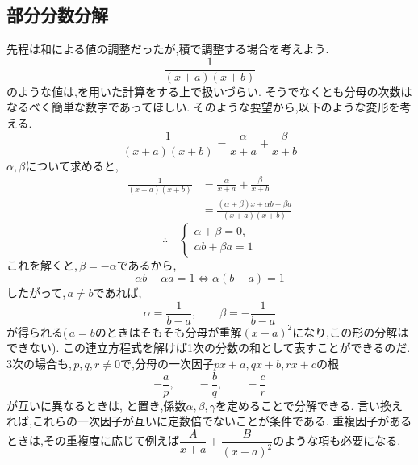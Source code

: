   \subsection{部分分数分解}\label{節：部分分数分解}
    先程は和による値の調整だったが,積で調整する場合を考えよう.
    \[
      \frac{1}{(x+a)(x+b)}
    \]
    のような値は,を用いた計算をする上で扱いづらい.
    そうでなくとも分母の次数はなるべく簡単な数字であってほしい.
    そのような要望から,以下のような変形を考える.
    \[
      \frac{1}{(x+a)(x+b)}=\frac{\alpha}{x+a}+\frac{\beta}{x+b}
    \]
    $\alpha,\beta$について求めると,
    \begin{align*}
    \frac{1}{(x+a)(x+b)}
      &= \frac{\alpha}{x+a}+\frac{\beta}{x+b}\\
      &= \frac{(\alpha+\beta)x+\alpha b+\beta a}
      {(x+a)(x+b)}
    \end{align*}
    \[
    \therefore\quad
    \begin{cases}
    \alpha+\beta=0,\\
    \alpha b+\beta a=1
    \end{cases}
    \]
    これを解くと,\,$\beta=-\alpha$であるから,
    \[
      \alpha b-\alpha a=1
      \iff \alpha(b-a)=1
    \]
    したがって,\,$a\ne b$であれば,
    \[
      \alpha=\frac{1}{b-a},
      \qquad
      \beta=-\frac{1}{b-a}
    \]
    が得られる(\,$a=b$のときはそもそも分母が重解$(x+a)^2$になり,この形の分解はできない).
    この連立方程式を解けば1次の分数の和として表すことができるのだ.
    3次の場合も,\,$p,q,r\ne0$で,分母の一次因子$px+a,qx+b,rx+c$の根
    \[
      -\frac{a}{p},\qquad -\frac{b}{q},\qquad -\frac{c}{r}
    \]
    が互いに異なるときは,
\BookMathLayout{\[
      \frac{1}{(px+a)(qx+b)(rx+c)}=\frac{\alpha}{px+a}+\frac{\beta}{qx+b}+\frac{\gamma}{rx+c}
    \]}{
\[
\begin{aligned}
\frac{1}{(px+a)(qx+b)(rx+c)}
&=\frac{\alpha}{px+a}+\frac{\beta}{qx+b}\\
&\quad+\frac{\gamma}{rx+c}
\end{aligned}
\]
}
    と置き,係数$\alpha,\beta,\gamma$を定めることで分解できる.
    言い換えれば,これらの一次因子が互いに定数倍でないことが条件である.
    重複因子があるときは,その重複度に応じて例えば$\dfrac{A}{x+a}+\dfrac{B}{(x+a)^2}$のような項も必要になる.
